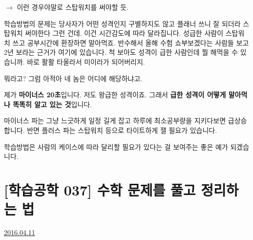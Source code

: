 $\rightarrow$ 이런 경우야말로 스탑워치를 써야할 듯.
\vspace{5mm}

학습방법의 문제는 당사자가 어떤 성격인지 구별하지도 않고 플래너 쓰니 잘 되더라 스탑워치 써야한다 그런 건데.
이건 시간감도에 따라 달라집니다.
성급한 사람이 스탑워치 쓰고 공부시간에 환장하면 말아먹죠.
반수해서 올해 수험 쇼부보겠다는 사람들 보고 2년 보라는 근거가 여기에 있습니다.
척 보아도 성격이 급한 사람인데 뭘 해먹을 수 있습니까. 바로 활활 타올라서 미이라가 되어버리지.
\vspace{5mm}

뭐라고? 그럼 아적아 네 놈은 어디에 해당하냐고.
\vspace{5mm}

제가 \textbf{마이너스 20초}입니다. 저도 왕급한 성격이죠. 그래서 \textbf{급한 성격이 어떻게 말아먹나 똑똑히 알고 있는 것}입니다.
\vspace{5mm}

마이너스 파는 그냥 느긋하게 일정 길게 잡고 하루에 최소공부량을 지키다보면 급상승합니다.
반면 플러스 파는 스탑워치 등으로 타이트하게 잴 필요가 있습니다.
\vspace{5mm}

학습방법은 사람의 케이스에 따라 달리할 필요가 있다는 걸 보여주는 좋은 예가 되겠습니다.
\vspace{5mm}




\section{[학습공학 037] 수학 문제를 풀고 정리하는 법}
\href{https://www.kockoc.com/Apoc/723102}{2016.04.11}

